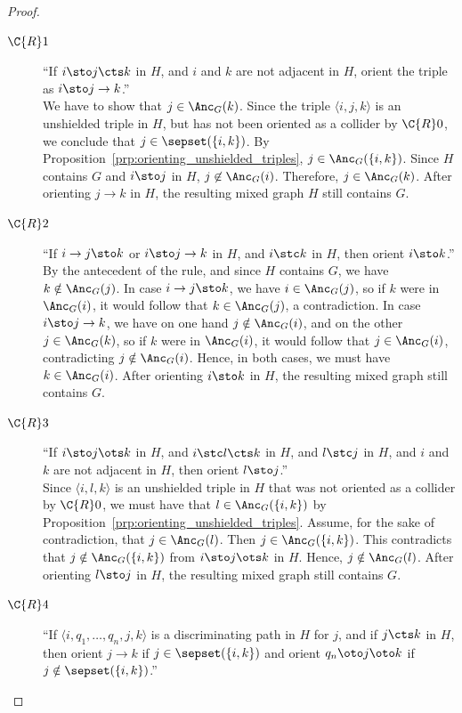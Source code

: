 \begin{proof}
  \begin{description}
    \item[$\C{R}1$] ``If $i \sto j \cts k$ in $H$, and $i$ and $k$ are not adjacent in $H$, orient the triple as $i \sto j \to k$.''\\
      We have to show that $j \in \Anc_G(k)$.
      Since the triple $\langle i, j, k \rangle$ is an unshielded triple in $H$, but has not been oriented as a collider by $\C{R}0$, we conclude that $j \in \sepset(\{i,k\})$. 
      By Proposition~\ref{prp:orienting_unshielded_triples}, $j \in \Anc_G(\{i,k\})$.
      Since $H$ contains $G$ and $i \sto j$ in $H$, $j \not\in \Anc_G(i)$. 
      Therefore, $j \in \Anc_G(k)$.
      After orienting $j \to k$ in $H$, the resulting mixed graph $H$ still contains $G$.
    \item[$\C{R}2$] ``If $i \to j \sto k$ or $i \sto j \to k$ in $H$, and $i \stc k$ in $H$, then orient $i \sto k$.''\\
      By the antecedent of the rule, and since $H$ contains $G$, we have $k \notin \Anc_G(j)$.
      In case $i \to j \sto k$, we have $i \in \Anc_G(j)$, so if $k$ were in $\Anc_G(i)$, it would follow that $k \in \Anc_G(j)$, a contradiction.
      In case $i \sto j \to k$, we have on one hand $j \notin \Anc_G(i)$, and on the other $j \in \Anc_G(k)$, so if $k$ were in $\Anc_G(i)$, it would follow that $j \in \Anc_G(i)$, contradicting $j \notin \Anc_G(i)$.
      Hence, in both cases, we must have $k \in \Anc_G(i)$.
      After orienting $i \sto k$ in $H$, the resulting mixed graph still contains $G$.
    \item[$\C{R}3$] ``If $i \sto j \ots k$ in $H$, and $i \stc l \cts k$ in $H$, and $l \stc j$ in $H$, and $i$ and $k$ are not adjacent in $H$, then orient $l \sto j$.''\\
      Since $\langle i, l, k \rangle$ is an unshielded triple in $H$ that was not oriented as a collider by $\C{R}0$, we must have that $l \in \Anc_G(\{i,k\})$ by Proposition~\ref{prp:orienting_unshielded_triples}.
      Assume, for the sake of contradiction, that $j \in \Anc_G(l)$. 
      Then $j \in \Anc_G(\{i,k\})$.
      This contradicts that $j \notin \Anc_G(\{i,k\})$ from $i \sto j \ots k$ in $H$.
      Hence, $j \notin \Anc_G(l)$.
      After orienting $l \sto j$ in $H$, the resulting mixed graph still contains $G$.
    \item[$\C{R}4$] ``If $\langle i, q_1, \dots, q_n, j, k \rangle$ is a discriminating path in $H$ for $j$, and if $j \cts k$ in $H$, then orient $j \to k$ if $j \in \sepset(\{i,k\})$ and orient $q_n \oto j \oto k$ if $j \notin \sepset(\{i,k\})$.''\\

\end{description}
\end{proof}
